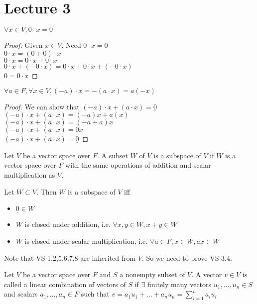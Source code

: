 \documentclass[answers,12pt,addpoints]{exam}
\begin{document}
\section{Lecture 3}
\begin{theorem}[Theorem 1.2(a)]
    $\forall x \in V, 0 \cdot x = \underline{0}$
    \begin{proof}
        Given $x \in V$. Need $0 \cdot x = \underline{0}$\\
        $0 \cdot x = (0 + 0) \cdot x$\\
        $0 \cdot x = 0 \cdot x + 0 \cdot x$\\
        $0 \cdot x + (-0 \cdot x) = 0 \cdot x + 0 \cdot x + (-0 \cdot x)$\\
        $0 = 0 \cdot x$
    \end{proof}
\end{theorem}
\begin{theorem}[Theorem 1.2(b)]
    $\forall a \in F, \forall x \in V, (-a) \cdot x = -(a \cdot x) = a(-x)$
    \begin{proof}
        We can show that $(-a) \cdot x + (a \cdot x) = \underline{0}$\\
        $(-a) \cdot x + (a \cdot x) = (-a)x + a(x)$\\
        $(-a) \cdot x + (a \cdot x) = (-a + a)x$\\
        $(-a) \cdot x + (a \cdot x) = {0}x$\\
        $(-a) \cdot x + (a \cdot x) = \underline{0}$
    \end{proof}
\end{theorem}
\begin{definition}
    Let $V$ be a vector space over $F$. A subset $W$ of $V$ is a subspace of $V$ if $W$ is a vector space over $F$ with the same operations of addition and scalar multiplication as $V$.
\end{definition}
\begin{theorem}[Theorem 1.3]
    Let $W \subset V$. Then $W$ is a subspace of $V$ iff
    \begin{itemize}
        \item $\underline{0} \in W$
        \item $W$ is closed under addition, i.e. $\forall x,y \in W, x + y \in W$
        \item $W$ is closed under scalar multiplication, i.e. $\forall a \in F, x \in W, ax \in W$
    \end{itemize}
    Note that VS 1,2,5,6,7,8 are inherited from $V$.
    So we need to prove VS 3,4.
\end{theorem}
\begin{definition}
    Let $V$ be a vector space over $F$ and $S$ a nonempty subset of $V$. A vector $v \in V$ is called a linear combination of vectors of $S$ if $\exists$ finitely many vectors $u_1, \dots, u_n \in S$ and scalars $a_1, \dots, a_n \in F$ such that $v = a_1u_1 + \dots + a_nu_n = \sum_{i=1}^n a_i u_i$
\end{definition}
\end{document}
